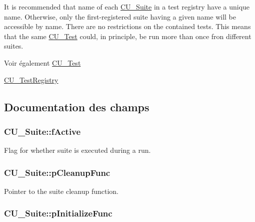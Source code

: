 It is recommended that name of each \hyperlink{structCU__Suite}{C\-U\-\_\-\-Suite} in a test registry have a unique name. Otherwise, only the first-\/registered suite having a given name will be accessible by name. There are no restrictions on the contained tests. This means that the same \hyperlink{structCU__Test}{C\-U\-\_\-\-Test} could, in principle, be run more than once fron different suites.

\begin{DoxySeeAlso}{Voir également}
\hyperlink{structCU__Test}{C\-U\-\_\-\-Test} 

\hyperlink{structCU__TestRegistry}{C\-U\-\_\-\-Test\-Registry} 
\end{DoxySeeAlso}


\subsection{Documentation des champs}
\hypertarget{structCU__Suite_aeee5e5385d60b0d36b3e2507d4f579dc}{
\subsubsection[{f\-Active}]{ C\-U\-\_\-\-Suite\-::f\-Active}}\label{structCU__Suite_aeee5e5385d60b0d36b3e2507d4f579dc}


Flag for whether suite is executed during a run. 

\hypertarget{structCU__Suite_aee36fd856e07775ba3cbb91af2219c25}{
\subsubsection[{p\-Cleanup\-Func}]{ C\-U\-\_\-\-Suite\-::p\-Cleanup\-Func}}\label{structCU__Suite_aee36fd856e07775ba3cbb91af2219c25}


Pointer to the suite cleanup function. 

\hypertarget{structCU__Suite_a572516b68f25492ac8e8ac720debfdb3}{
\subsubsection[{p\-Initialize\-Func}]{ C\-U\-\_\-\-Suite\-::p\-Initialize\-Func}}\label{structCU__Suite_a572516b68f25492ac8e8ac720debfdb3}


